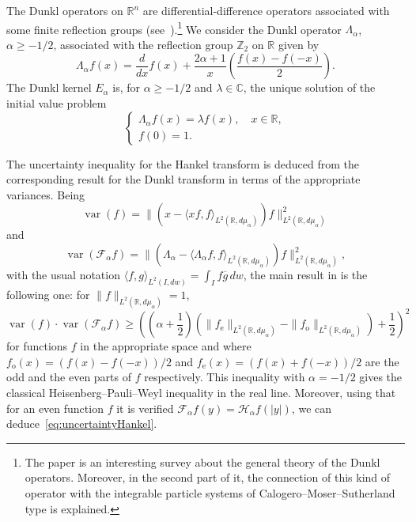 \documentclass[a4paper]{amsart}
\theoremstyle{plain}
\theoremstyle{definition}
\newcommand{\var}{\operatorname{var}}
\begin{document}
The Dunkl operators on $\mathbb{R}^n$ are differential-difference operators associated with some finite reflection groups (see~\cite{Dunkl}).\footnote{The paper \cite{Rosler} is an interesting survey about the general theory of the Dunkl operators. Moreover, in the second part of it, the connection of this kind of operator with the integrable particle systems of Calogero--Moser--Sutherland type is explained.} We consider the Dunkl operator $\Lambda_\alpha$, $\alpha \ge -1/2$, associated with the reflection group $\mathbb{Z}_2$ on $\mathbb{R}$ given by
\begin{equation*}
  \Lambda_\alpha f(x) = \frac{d}{dx}f(x)
    + \frac{2\alpha+1}{x} \left(\frac{f(x)-f(-x)}{2}\right).
\end{equation*}
The Dunkl kernel $E_\alpha$ is, for $\alpha \ge -1/2$ and $\lambda\in \mathbb{C}$, the unique solution of the initial value problem
\begin{equation}
\label{eq:dunklproblem}
\begin{cases}
  \Lambda_\alpha f(x) = \lambda f(x),\quad x\in \mathbb{R},\\
  f(0) = 1.
\end{cases}
\end{equation}

The uncertainty inequality for the Hankel transform is deduced from the corresponding result for the Dunkl transform in terms of the appropriate variances. Being
\[
\var(f) = \|(x-\langle xf,
f\rangle_{L^2(\mathbb{R},d\mu_\alpha)})f\|_{L^2(\mathbb{R},d\mu_\alpha)}^2
\]
and
\[
\var(\mathcal{F}_\alpha f) = \|(\Lambda_\alpha-\langle \Lambda_\alpha f,
f\rangle_{L^2(\mathbb{R},d\mu_\alpha)})f\|_{L^2(\mathbb{R},d\mu_\alpha)}^2,
\]
with the usual notation $\langle f,g \rangle_{L^2(I,dw)}=\int_{I}f\overline{g}\,dw$, the main result in \cite{Rosler-Voit2} is the following one: for $\|f\|_{L^2(\mathbb{R},d\mu_\alpha)}=1$,
\[
\var(f)\cdot \var(\mathcal{F}_\alpha f)
\ge \left(\left(\alpha+\frac12\right)
(\|f_\text{e}\|_{L^2(\mathbb{R},d\mu_\alpha)}
-\|f_\textrm{o}\|_{L^2(\mathbb{R},d\mu_\alpha)}) + \frac12\right)^2
\]
for functions $f$ in the appropriate space and where $f_\textrm{o}(x)=(f(x)-f(-x))/2$ and $f_\textrm{e}(x)=(f(x)+f(-x))/2$ are the odd and the even parts of $f$ respectively. This inequality with $\alpha=-1/2$ gives the classical Heisenberg--Pauli--Weyl inequality in the real line. Moreover, using that for an even function $f$ it is verified 
$\mathcal{F}_{\alpha}f(y)=\mathcal{H}_{\alpha}f(|y|)$, we can deduce~\eqref{eq:uncertaintyHankel}.
\end{document}
